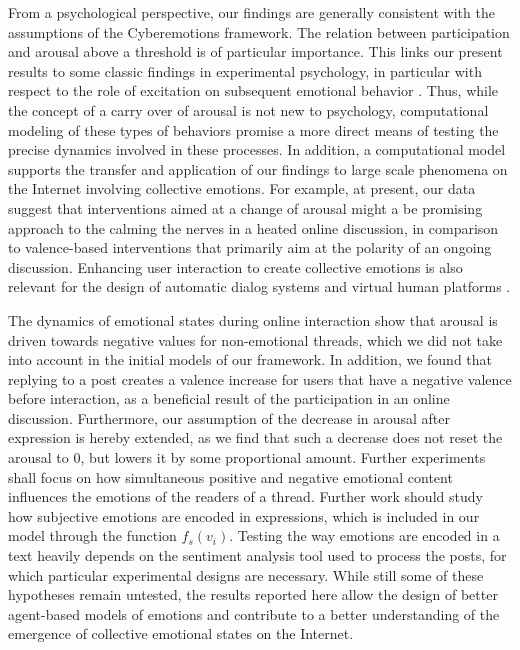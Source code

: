 \documentclass[nologo,url,11pt,a4paper]{ETHpaper}
\begin{document}
From a psychological perspective, our findings are generally consistent with
the assumptions of the Cyberemotions framework.  The relation between
participation and arousal above a threshold is of particular importance. This
links our present results to some classic findings in experimental psychology,
in particular with respect to the role of excitation on subsequent emotional
behavior \cite{Cantor1974,Cummins2012,Turnbull2002,Zillmann1974}. Thus, while
the concept of a carry over of arousal is not new to psychology, computational
modeling of these types of behaviors promise a more direct means of testing
the precise dynamics involved in these processes.  In addition, a
computational model supports the transfer and application of our
findings to large scale phenomena on the Internet involving collective
emotions. For example, at present, our data suggest that interventions aimed
at a change of arousal might a be promising approach to the calming the nerves
in a heated online discussion, in comparison to  valence-based interventions
that primarily aim at the polarity of an ongoing discussion. Enhancing
user interaction to create collective emotions is also relevant for the design
of automatic dialog systems \cite{Rank2013} and virtual human platforms
\cite{Ahn2012}.


The dynamics of emotional states during online interaction show that arousal
is driven towards negative values for non-emotional threads, which we did not
take into account in the initial models of our framework. In addition, we
found that replying to a post creates a valence increase for users that have a
negative valence before interaction, as a beneficial result of the
participation in an online discussion. Furthermore, our assumption of the
decrease in arousal after expression is hereby extended, as we find that such
a decrease does not reset the arousal to 0, but lowers it by some proportional
amount. Further experiments shall focus on how simultaneous positive and
negative emotional content influences the emotions of the readers of a thread.
Further work should study how subjective emotions are encoded in expressions,
which is included in our model through the function 
$f_s(v_i)$. 
Testing the way emotions are
encoded in a text heavily depends on the sentiment analysis tool used to
process the posts, for which particular experimental designs are necessary.
While still some of these hypotheses remain untested, the results reported here allow the design of better agent-based models of emotions and contribute to a better understanding of the emergence of collective emotional states on the Internet.
\end{document}
